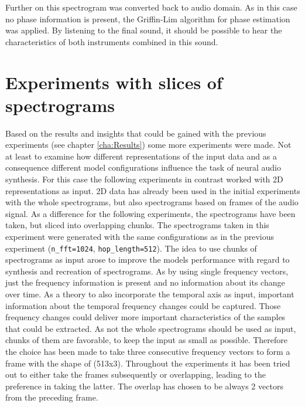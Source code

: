 Further on this spectrogram was converted back to audio domain. As in this case no phase information is present, the Griffin-Lim algorithm \cite{Griffin1984} for phase estimation was applied. By listening to the final sound, it should be possible to hear the characteristics of both instruments combined in this sound.

\section{Experiments with slices of spectrograms}
\label{sec:exp_spec_slice}
Based on the results and insights that could be gained with the previous experiments (see chapter \ref{cha:Results}) some more experiments were made. Not at least to examine how different representations of the input data and as a consequence different model configurations influence the task of neural audio synthesis. For this case the following experiments in contrast worked with 2D representations as input. 2D data has already been used in the initial experiments with the whole spectrograms, but also spectrograms based on frames of the audio signal. As a difference for the following experiments, the spectrograms have been taken, but sliced into overlapping chunks. The spectrograms taken in this experiment were generated with the same configurations as in the previous experiment (\texttt{n\_fft=1024}, \texttt{hop\_length=512}). The idea to use chunks of spectrograms as input arose to improve the models performance with regard to synthesis and recreation of spectrograms. As by using single frequency vectors, just the frequency information is present and no information about its change over time. As a theory to also incorporate the temporal axis as input, important information about the temporal frequency changes could be captured. Those frequency changes could deliver more important characteristics of the samples that could be extracted. As not the whole spectrograms should be used as input, chunks of them are favorable, to keep the input as small as possible. Therefore the choice has been made to take three consecutive frequency vectors to form a frame with the shape of (513x3). Throughout the experiments it has been tried out to either take the frames subsequently or overlapping, leading to the preference in taking the latter. The overlap has chosen to be always 2 vectors from the preceding frame. 

